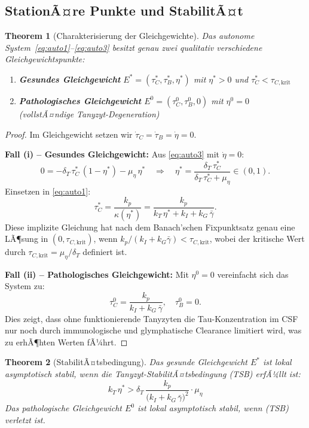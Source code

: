 ﻿\documentclass[12pt,a4paper]{article}
\newtheorem{theorem}{Theorem}[section]
\theoremstyle{definition}
\begin{document}
	\subsection{StationÃ¤re Punkte und StabilitÃ¤t}
	
	\begin{theorem}[Charakterisierung der Gleichgewichte]
		\label{thm:equilibria}
		Das autonome System~\eqref{eq:auto1}--\eqref{eq:auto3} besitzt genau zwei qualitativ verschiedene Gleichgewichtspunkte:
		
		\begin{enumerate}[label=(\roman*)]
			\item \textbf{Gesundes Gleichgewicht} $E^* = (\tau_C^*, \tau_B^*, \eta^*)$ mit $\eta^* > 0$ und $\tau_C^* < \tau_{C,\text{krit}}$
			\item \textbf{Pathologisches Gleichgewicht} $E^0 = (\tau_C^0, \tau_B^0, 0)$ mit $\eta^0 = 0$ (vollstÃ¤ndige Tanyzyt-Degeneration)
		\end{enumerate}
	\end{theorem}
	
	\begin{proof}
		Im Gleichgewicht setzen wir $\dot{\tau}_C = \dot{\tau}_B = \dot{\eta} = 0$.
		
		\textbf{Fall (i) -- Gesundes Gleichgewicht:} Aus \eqref{eq:auto3} mit $\dot{\eta} = 0$:
		\[
		0 = -\delta_T\,\tau_C^*\,(1-\eta^*) - \mu_\eta\,\eta^*
		\quad\Rightarrow\quad
		\eta^* = \frac{\delta_T\,\tau_C^*}{\delta_T\,\tau_C^* + \mu_\eta} \in (0,1).
		\]
		Einsetzen in \eqref{eq:auto1}:
		\[
		\tau_C^* = \frac{k_p}{\kappa(\eta^*)} = \frac{k_p}{k_T\,\eta^* + k_I + k_G\,\bar{\gamma}}.
		\]
		Diese implizite Gleichung hat nach dem Banach'schen Fixpunktsatz genau eine LÃ¶sung in $(0, \tau_{C,\text{krit}})$, wenn $k_p / (k_I + k_G\bar{\gamma}) < \tau_{C,\text{krit}}$, wobei der kritische Wert durch $\tau_{C,\text{krit}} = \mu_\eta / \delta_T$ definiert ist.
		
		\textbf{Fall (ii) -- Pathologisches Gleichgewicht:} Mit $\eta^0 = 0$ vereinfacht sich das System zu:
		\[
		\tau_C^0 = \frac{k_p}{k_I + k_G\,\bar{\gamma}}, \quad \tau_B^0 = 0.
		\]
		Dies zeigt, dass ohne funktionierende Tanyzyten die Tau-Konzentration im CSF nur noch durch immunologische und glymphatische Clearance limitiert wird, was zu erhÃ¶hten Werten fÃ¼hrt.
	\end{proof}
	
	\begin{theorem}[StabilitÃ¤tsbedingung]
		\label{thm:stability}
		Das gesunde Gleichgewicht $E^*$ ist lokal asymptotisch stabil, wenn die \emph{Tanyzyt-StabilitÃ¤tsbedingung} (TSB) erfÃ¼llt ist:
		\begin{equation}
			\boxed{k_T\,\eta^* > \delta_T\,\frac{k_p}{\bigl(k_I + k_G\,\bar{\gamma}\bigr)^2} \cdot \mu_\eta}
			\tag{TSB}
		\end{equation}
		Das pathologische Gleichgewicht $E^0$ ist lokal asymptotisch stabil, wenn (TSB) verletzt ist.
	\end{theorem}
	
\end{document}
